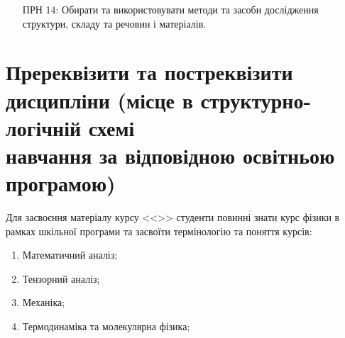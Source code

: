 \documentclass{Syllabus}
\begin{document}
\begin{enumerate}
	\item [ПРН 14:] Обирати та використовувати методи та засоби дослідження структури, складу та речовин і матеріалів.
\end{enumerate}


\section{Пререквізити та постреквізити дисципліни (місце в структурно-логічній схемі\\ навчання за відповідною освітньою програмою)}


Для засвоєння матеріалу курсу <<\discipline>> студенти повинні знати курс фізики в рамках шкільної програми та засвоїти термінологію та поняття курсів:
\begin{enumerate}
	\item Математичний аналіз;
	\item Тензорний аналіз;
	\item Механіка;
	\item Термодинаміка та молекулярна фізика;
\end{enumerate}
\end{document}
